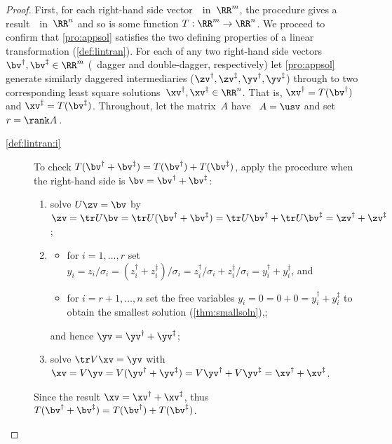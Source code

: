 \begin{proof} 
First, for each right-hand side vector~\bv\ in~\(\RR^m\), the procedure gives a result~\xv\ in~\(\RR^n\) and so is some function \(T:\RR^m\to\RR^n\).
We proceed to confirm that \cref{pro:appsol} satisfies the two defining properties of a linear transformation (\cref{def:lintran}).
For each of any two right-hand side vectors \(\bv^\dag,\bv^\ddag\in\RR^m\) (\bv\ dagger and double-dagger, respectively) let \cref{pro:appsol} generate similarly daggered intermediaries (\(\zv^\dag,\zv^\ddag,\yv^\dag,\yv^\ddag\)) through to two corresponding least square solutions~\(\xv^\dag,\xv^\ddag\in\RR^n\).
That is, \(\xv^\dag=T(\bv^\dag)\) and \(\xv^\ddag=T(\bv^\ddag)\).
Throughout, let the matrix~\(A\) have \svd\ \(A=\usv\) and set \(r=\rank A\)\,.
\begin{description}
\item[\ref{def:lintran:i}]  
To check \(T(\bv^\dag+\bv^\ddag)=T(\bv^\dag)+T(\bv^\ddag)\), apply the procedure when the right-hand side is \(\bv=\bv^\dag+\bv^\ddag\):
\begin{enumerate}
\item solve \(U\zv=\bv\) by \(\zv=\tr U\bv=\tr U(\bv^\dag+\bv^\ddag)=\tr U\bv^\dag+\tr U\bv^\ddag=\zv^\dag+\zv^\ddag\);
\item \begin{itemize}
\item for \(i=1,\ldots,r\) set \(y_i=z_i/\sigma_i=(z^\dag_i+z^\ddag_i)/\sigma_i=z^\dag_i/\sigma_i+z^\ddag_i/\sigma_i=y^\dag_i+y^\ddag_i\), and
\item for \(i=r+1,\ldots,n\) set the free variables \(y_i=0=0+0=y^\dag_i+y^\ddag_i\) to obtain the smallest solution (\cref{thm:smallsoln}),;
\end{itemize}
and hence \(\yv=\yv^\dag+\yv^\ddag\);
\item solve \(\tr V\xv=\yv\) with \(\xv=V\yv=V(\yv^\dag+\yv^\ddag)=V\yv^\dag+V\yv^\ddag=\xv^\dag+\xv^\ddag\).
\end{enumerate}
Since the result \(\xv=\xv^\dag+\xv^\ddag\), thus \(T(\bv^\dag+\bv^\ddag)=T(\bv^\dag)+T(\bv^\ddag)\).


\end{description}
\end{proof}
